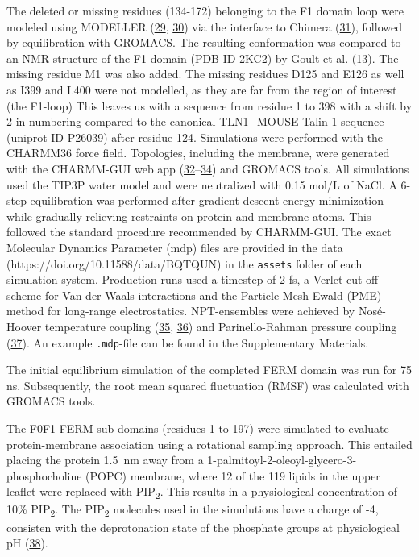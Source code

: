 \documentclass[
  twocolumn]{biophys-new-mod}
\begin{document}
The deleted or missing residues (134-172) belonging to the F1 domain
loop were modeled using MODELLER
(\protect\hyperlink{ref-marti-renomComparativeProteinStructure2000}{29},
\protect\hyperlink{ref-webbComparativeProteinStructure2016}{30}) via the
interface to Chimera
(\protect\hyperlink{ref-pettersenUCSFChimeraVisualization2004}{31}),
followed by equilibration with GROMACS. The resulting conformation was
compared to an NMR structure of the F1 domain (PDB-ID 2KC2) by Goult et
al. (\protect\hyperlink{ref-goultStructureDoubleUbiquitinlike2010}{13}).
The missing residue M1 was also added. The missing residues D125 and
E126 as well as I399 and L400 were not modelled, as they are far from
the region of interest (the F1-loop) This leaves us with a sequence from
residue 1 to 398 with a shift by 2 in numbering compared to the
canonical TLN1\_MOUSE Talin-1 sequence (uniprot ID P26039) after residue
124. Simulations were performed with the CHARMM36 force field.
Topologies, including the membrane, were generated with the CHARMM-GUI
web app
(\protect\hyperlink{ref-brooksCHARMMBiomolecularSimulation2009}{32}--\protect\hyperlink{ref-leeCHARMMGUIInputGenerator2016}{34})
and GROMACS tools. All simulations used the TIP3P water model and were
neutralized with 0.15 mol/L of NaCl. A 6-step equilibration was
performed after gradient descent energy minimization while gradually
relieving restraints on protein and membrane atoms. This followed the
standard procedure recommended by CHARMM-GUI. The exact Molecular
Dynamics Parameter (mdp) files are provided in the data
(https://doi.org/10.11588/data/BQTQUN) in the \texttt{assets} folder of
each simulation system. Production runs used a timestep of 2 fs, a
Verlet cut-off scheme for Van-der-Waals interactions and the Particle
Mesh Ewald (PME) method for long-range electrostatics. NPT-ensembles
were achieved by Nosé-Hoover temperature coupling
(\protect\hyperlink{ref-hooverCanonicalDynamicsEquilibrium1985}{35},
\protect\hyperlink{ref-noseUnifiedFormulationConstant1984}{36}) and
Parinello-Rahman pressure coupling
(\protect\hyperlink{ref-parrinelloPolymorphicTransitionsSingle1981}{37}).
An example \texttt{.mdp}-file can be found in the Supplementary
Materials.

The initial equilibrium simulation of the completed FERM domain was run
for 75 ns. Subsequently, the root mean squared fluctuation (RMSF) was
calculated with GROMACS tools.

The F0F1 FERM sub domains (residues 1 to 197) were simulated to evaluate
protein-membrane association using a rotational sampling approach. This
entailed placing the protein 1.5~nm away from a
1-palmitoyl-2-oleoyl-glycero-3-phosphocholine (POPC) membrane, where 12
of the 119 lipids in the upper leaflet were replaced with
PIP\textsubscript{2}. This results in a physiological concentration of
10\% PIP\textsubscript{2}. The PIP\textsubscript{2} molecules used in
the simulutions have a charge of -4, consisten with the deprotonation
state of the phosphate groups at physiological pH
(\protect\hyperlink{ref-mclaughlinPIP2ProteinsInteractions2002}{38}).
\end{document}
